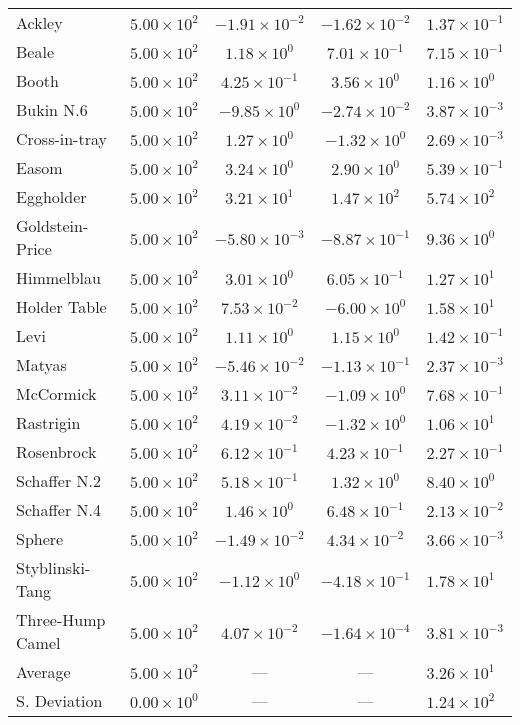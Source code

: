 \begin{longtable}{|l|r|c|c|l|}
    Ackley &	$5.00 \times 10^{2}$ &	$-1.91 \times 10^{-2}$ &	$-1.62 \times 10^{-2}$ &	$1.37 \times 10^{-1}$\\
    Beale &	$5.00 \times 10^{2}$ &	$1.18 \times 10^{0}$ &	$7.01 \times 10^{-1}$ &	$7.15 \times 10^{-1}$\\
    Booth &	$5.00 \times 10^{2}$ &	$4.25 \times 10^{-1}$ &	$3.56 \times 10^{0}$ &	$1.16 \times 10^{0}$\\
    Bukin N.6 &	$5.00 \times 10^{2}$ &	$-9.85 \times 10^{0}$ &	$-2.74 \times 10^{-2}$ &	$3.87 \times 10^{-3}$\\
    Cross-in-tray &	$5.00 \times 10^{2}$ &	$1.27 \times 10^{0}$ &	$-1.32 \times 10^{0}$ &	$2.69 \times 10^{-3}$\\
    Easom &	$5.00 \times 10^{2}$ &	$3.24 \times 10^{0}$ &	$2.90 \times 10^{0}$ &	$5.39 \times 10^{-1}$\\
    Eggholder &	$5.00 \times 10^{2}$ &	$3.21 \times 10^{1}$ &	$1.47 \times 10^{2}$ &	$5.74 \times 10^{2}$\\
    Goldstein-Price &	$5.00 \times 10^{2}$ &	$-5.80 \times 10^{-3}$ &	$-8.87 \times 10^{-1}$ &	$9.36 \times 10^{0}$\\
    Himmelblau &	$5.00 \times 10^{2}$ &	$3.01 \times 10^{0}$ &	$6.05 \times 10^{-1}$ &	$1.27 \times 10^{1}$\\
    Holder Table &	$5.00 \times 10^{2}$ &	$7.53 \times 10^{-2}$ &	$-6.00 \times 10^{0}$ &	$1.58 \times 10^{1}$\\
    Levi &	$5.00 \times 10^{2}$ &	$1.11 \times 10^{0}$ &	$1.15 \times 10^{0}$ &	$1.42 \times 10^{-1}$\\
    Matyas &	$5.00 \times 10^{2}$ &	$-5.46 \times 10^{-2}$ &	$-1.13 \times 10^{-1}$ &	$2.37 \times 10^{-3}$\\
    McCormick &	$5.00 \times 10^{2}$ &	$3.11 \times 10^{-2}$ &	$-1.09 \times 10^{0}$ &	$7.68 \times 10^{-1}$\\
    Rastrigin &	$5.00 \times 10^{2}$ &	$4.19 \times 10^{-2}$ &	$-1.32 \times 10^{0}$ &	$1.06 \times 10^{1}$\\
    Rosenbrock &	$5.00 \times 10^{2}$ &	$6.12 \times 10^{-1}$ &	$4.23 \times 10^{-1}$ &	$2.27 \times 10^{-1}$\\
    Schaffer N.2 &	$5.00 \times 10^{2}$ &	$5.18 \times 10^{-1}$ &	$1.32 \times 10^{0}$ &	$8.40 \times 10^{0}$\\
    Schaffer N.4 &	$5.00 \times 10^{2}$ &	$1.46 \times 10^{0}$ &	$6.48 \times 10^{-1}$ &	$2.13 \times 10^{-2}$\\
    Sphere &	$5.00 \times 10^{2}$ &	$-1.49 \times 10^{-2}$ &	$4.34 \times 10^{-2}$ &	$3.66 \times 10^{-3}$\\
    Styblinski-Tang &	$5.00 \times 10^{2}$ &	$-1.12 \times 10^{0}$ &	$-4.18 \times 10^{-1}$ &	$1.78 \times 10^{1}$\\
    Three-Hump Camel &	$5.00 \times 10^{2}$ &	$4.07 \times 10^{-2}$ &	$-1.64 \times 10^{-4}$ &	$3.81 \times 10^{-3}$\\
    \hline 
    \hline
    Average &	$5.00 \times 10^{2}$ &	--- &	--- &	$3.26 \times 10^{1}$\\
    \hline
    S. Deviation &	$0.00 \times 10^{0}$ &	--- &	--- &	$1.24 \times 10^{2}$\\
\end{longtable}
